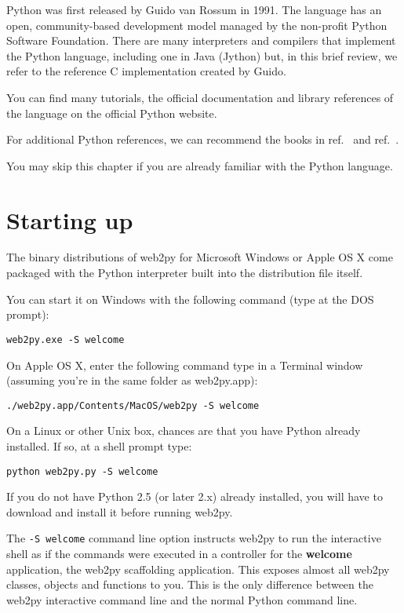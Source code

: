 \documentclass[justified,sixbynine,notoc]{tufte-book}
\def\ft{\small\tt}
\def\inxx#1{\index{#1}}
\begin{document}
\begin{fullwidth}
Python was first released by Guido van Rossum in 1991. The language has an open, community-based development model managed by the non-profit Python Software Foundation. There are many interpreters and compilers that implement the Python language, including one in Java (Jython) but, in this brief review, we refer to the reference C implementation created by Guido.

You can find many tutorials, the official documentation and library references of the language on the official Python website.~\cite{python}

For additional Python references, we can recommend the books in ref.~\cite{guido}  and ref.~\cite{lutz}.

You may skip this chapter if you are already familiar with the Python language.

\goodbreak\section{Starting up}

\inxx{shell}
The binary distributions of web2py for Microsoft Windows or Apple OS X come packaged with the Python interpreter built into the distribution file itself.

You can start it on Windows with the following command (type at the DOS prompt):
\begin{lstlisting}
web2py.exe -S welcome
\end{lstlisting}

On Apple OS X, enter the following command type in a Terminal window (assuming you're in the same folder as web2py.app):
\begin{lstlisting}
./web2py.app/Contents/MacOS/web2py -S welcome
\end{lstlisting}

On a Linux or other Unix box, chances are that you have Python already installed. If so, at a shell prompt type:
\begin{lstlisting}
python web2py.py -S welcome
\end{lstlisting}

If you do not have Python 2.5 (or later 2.x) already installed, you will have to download and install it before running web2py.

The {\ft -S welcome} command line option instructs web2py to run the interactive shell as if the commands were executed in a controller for the {\bf welcome} application, the web2py scaffolding application. This exposes almost all web2py classes, objects and functions to you. This is the only difference between the web2py interactive command line and the normal Python command line.


\end{fullwidth}
\end{document}
